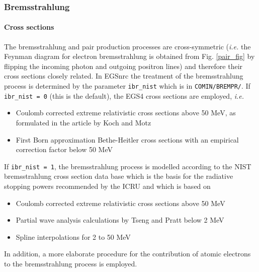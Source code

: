 \subsubsection{Bremsstrahlung}
\setcounter{equation}{0}
\label{bremsstrahlung}

\paragraph{Cross sections} \hfill
{}

The bremsstrahlung and pair production processes are cross-symmetric
({\em i.e.} the Feynman diagram for electron bremsstrahlung is
obtained from Fig. \ref{pair_fig} by flipping the incoming
photon and outgoing positron lines) and therefore their cross sections
closely related. In EGSnrc the treatment of the bremsstrahlung process
is determined by the parameter {\tt ibr\_nist} which is
in {\tt COMIN/BREMPR/}. If {\tt ibr\_nist = 0} (this is the default),
the EGS4 cross sections are employed, {\em i.e.}
\begin{itemize}
\item
Coulomb corrected extreme relativistic cross sections
above 50 MeV, as formulated in the article by Koch and Motz \cite{KM59}
\item
First Born approximation Bethe-Heitler cross sections
with an empirical correction factor below 50 MeV \cite{KM59}
\end{itemize}
If {\tt ibr\_nist = 1}, the bremsstrahlung process is modelled according
to the NIST bremsstrahlung cross section data base \cite{SB85,SB86a} which
is the basis for the radiative stopping powers recommended
by the ICRU \cite{ICRU37} and which is based on
\begin{itemize}
\item
Coulomb corrected extreme relativistic cross sections
above 50 MeV
\item
Partial wave analysis calculations by Tseng and Pratt \cite{TP71}
below 2 MeV
\item
Spline interpolations for 2 to 50 MeV
\end{itemize}
In addition, a more elaborate procedure for the contribution of
atomic electrons to the bremsstrahlung process is employed. 

